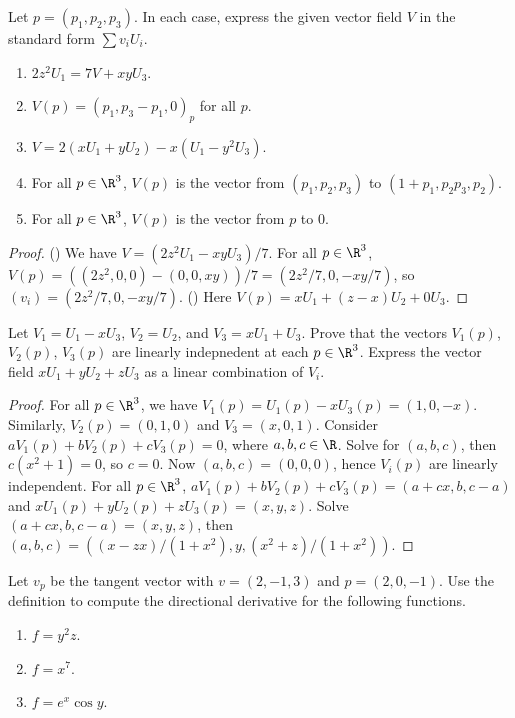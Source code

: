 \begin{exercise}[1.2.3]
    Let $p=({p}_{1},{p}_{2},{p}_{3})$. In each case, express the given vector field $V$ in the standard form $\sum{v}_{i}{U}_{i}$. 
    \begin{enumerate}
        \item $2{z}^{2}{U}_{1}=7V+xy{U}_{3}$.
        \item $V(p)={({p}_{1},{p}_{3}-{p}_{1},0)}_{p}$ for all $p$.
        \item $V=2(x{U}_{1}+y{U}_{2})-x({U}_{1}-{y}^{2}{U}_{3})$.
        \item For all $p\in{\R}^{3}$, $V(p)$ is the vector from $({p}_{1},{p}_{2},{p}_{3})$ to $(1+{p}_{1},{p}_{2}{p}_{3},{p}_{2})$.
        \item For all $p\in{\R}^{3}$, $V(p)$ is the vector from $p$ to 0.
    \end{enumerate}
\end{exercise}
\begin{proof}
    () We have $V=(2{z}^{2}{U}_{1}-xy{U}_{3})/7$. For all $p\in{\R}^{3}$, $V(p)=((2{z}^{2},0,0)-(0,0,xy))/7=(2{z}^{2}/7,0,-xy/7)$, so $({v}_{i})=(2{z}^{2}/7,0,-xy/7)$. () Here $V(p)=x{U}_{1}+(z-x){U}_{2}+0{U}_{3}$.
\end{proof}
\begin{exercise}[1.2.5]
    Let ${V}_{1}={U}_{1}-x{U}_{3}$, ${V}_{2}={U}_{2}$, and ${V}_{3}=x{U}_{1}+{U}_{3}$. Prove that the vectors ${V}_{1}(p)$, ${V}_{2}(p)$, ${V}_{3}(p)$ are linearly indepnedent at each $p\in{\R}^{3}$. Express the vector field $x{U}_{1}+y{U}_{2}+z{U}_{3}$ as a linear combination of ${V}_{i}$.
\end{exercise}
\begin{proof}
    For all $p\in{\R}^{3}$, we have ${V}_{1}(p)={U}_{1}(p)-x{U}_{3}(p)=(1,0,-x)$. Similarly, ${V}_{2}(p)=(0,1,0)$ and ${V}_{3}=(x,0,1)$. Consider $a{V}_{1}(p)+b{V}_{2}(p)+c{V}_{3}(p)=0$, where $a,b,c\in\R$. Solve for $(a,b,c)$, then $c({x}^{2}+1)=0$, so $c=0$. Now $(a,b,c)=(0,0,0)$, hence ${V}_{i}(p)$ are linearly independent. For all $p\in{\R}^{3}$, $a{V}_{1}(p)+b{V}_{2}(p)+c{V}_{3}(p)=(a+cx,b,c-a)$ and $x{U}_{1}(p)+y{U}_{2}(p)+z{U}_{3}(p)=(x,y,z)$. Solve $(a+cx,b,c-a)=(x,y,z)$, then $(a,b,c)=((x-zx)/(1+{x}^{2}),y,({x}^{2}+z)/(1+{x}^{2}))$. 
\end{proof}
\begin{exercise}[1.3.1]
    Let ${v}_{p}$ be the tangent vector with $v=(2,-1,3)$ and $p=(2,0,-1)$. Use the definition to compute the directional derivative for the following functions.
    \begin{enumerate}
        \item $f={y}^{2}z$.
        \item $f={x}^{7}$.
        \item $f={e}^{x}\cos y$.
    \end{enumerate}
\end{exercise}
